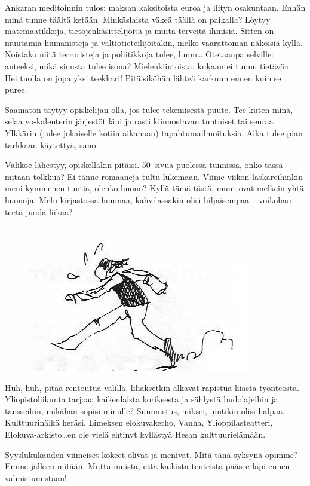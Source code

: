 \documentclass[a5paper, 8pt, twocolumn]{book} %
\numberwithin{equation}{section}
\begin{document}
Ankaran meditoinnin tulos: maksan kaksitoista euroa ja liityn osakuntaan.
Enhän minä tunne täältä ketään. Minkäslaista
väkeä täällä on paikalla? Löytyy
matemaatikkoja, tietojen\-käsittelijöitä ja
muita terveitä ihmisiä. Sitten on muutamia
humanisteja ja valtio\-tieteilijöitäkin, melko vaarattoman näköisiä kyllä. Noistako niitä
terroristeja ja poliitikkoja tulee, hmm\dots
Otetaanpa selville: anteeksi, mikä sinusta
tulee isona? Mielenkiintoista, kukaan
ei tunnu tietävän. Hei tuolla on jopa yksi
teekkari! Pitäisiköhän lähteä karkuun ennen
kuin se puree.

Saamaton täytyy opiskelijan olla, jos
tulee tekemisestä puute. Tee kuten minä,
selaa yo-kalenterin järjestöt läpi ja rasti
kiinnostavan tuntuiset tai seuraa Ylkkärin (tulee jokaiselle kotiin aikanaan) tapahtumailmoituksia. Aika tulee pian tarkkaan
käytettyä, sano.

Välikoe lähestyy, opiskellakin pitäisi.
50~sivua puolessa tunnissa, onko tässä mitään
tolkkua? Ei tänne romaaneja tultu lukemaan.
Viime viikon laskareihinkin meni
kymmenen tuntia, olenko huono? Kyllä
tämä tästä, muut ovat melkein yhtä huonoja.
Melu kirjastossa huumaa, kahvilassakin
olisi hiljaisempaa -- voikohan teetä juoda
liikaa?
\begin{figure}
	\centering
	\includegraphics[width=0.8\columnwidth]{pallohukassa2.png}
\end{figure}

Huh, huh, pitää rentoutua välillä, lihaksetkin
alkavat rapistua liiasta työnteosta.
Yliopisto\-liikunta tarjoaa kaikenlaista koriksesta
ja sählystä budolajeihin ja tansseihin,
mikähän sopisi minulle? Suunnistus,
miksei, uintikin olisi halpaa. Kulttuuri\-nälkä
heräsi. Limeksen elokuva\-kerho,
Vanha, Ylioppilas\-teatteri, Elokuva-arkisto\dots en ole
vielä ehtinyt kyllästyä Hesan kulttuuri\-elämään.

Syyslukukauden viimeiset kokeet olivat
ja menivät. Mitä tänä syksynä opimme?
Emme jälleen mitään. Mutta muista, että
kaikista tenteistä pääsee läpi ennen valmistumistaan!
\end{document}
